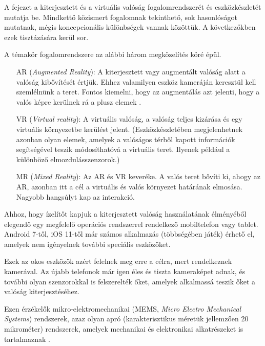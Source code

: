 
A fejezet a kiterjesztett és a virtuális valóság fogalomrendszerét és eszközkészletét mutatja be.
Mindkettő közismert fogalomnak tekinthető, sok hasonlóságot mutatnak, mégis koncepcionális különbségek vannak közöttük.
A következőkben ezek tisztázására kerül sor.


A témakör fogalomrendszere az alábbi három megközelítés köré épül.
\begin{itemize}
\item[AR] (\textit{Augmented Reality}):
A kiterjesztett vagy augmentált valóság alatt a valóság kibővítését értjük. Ehhez valamilyen eszköz kameráján keresztül kell szemlélnünk a teret. Fontos kiemelni, hogy az augmentálás azt jelenti, hogy a valós képre kerülnek rá a plusz elemek \cite{schmalstieg2016augmented}.
\item[VR] (\textit{Virtual reality}): A virtuális valóság, a valóság teljes kizárása és egy virtuális környezetbe kerülést jelent. (Eszközkészletében megjelenhetnek azonban olyan elemek, amelyek a valóságos térből kapott információk segítségével teszik módosíthatóvá a virtuális teret. Ilyenek például a különböző elmozdulásszenzorok.)
\item[MR] (\textit{Mixed Reality}): Az AR és VR keveréke. A valós teret bővíti ki, ahogy az AR, azonban itt a cél a virtuális és valós környezet határának elmosása. Nagyobb hangsúlyt kap az interakció. 
\end{itemize}



Ahhoz, hogy ízelítőt kapjuk a kiterjesztett valóság használatának élményéből elegendő egy megfelelő operációs rendszerrel rendelkező mobiltelefon vagy tablet.
Android 7-től, iOS 11-től már számos alkalmazás (többségében játék) érhető el, amelyek nem igényelnek további speciális eszközöket. 

Ezek az okos eszközök azért felelnek meg erre a célra, mert rendelkeznek kamerával.
Az újabb telefonok már igen éles és tiszta kameraképet adnak, és további olyan szenzorokkal is felszerelték őket, amelyek alkalmassá teszik őket a valóság kiterjesztéséhez.

Ezen érzékelők  mikro-elektromechanikai (MEMS, \textit{Micro Electro Mechanical Systems}) 
rendszerek, azaz olyan apró (karakterisztikus méretük jellemzően 20 mikrométer) rendszerek, amelyek mechanikai és elektronikai alkatrészeket is tartalmaznak \cite{mems}.

